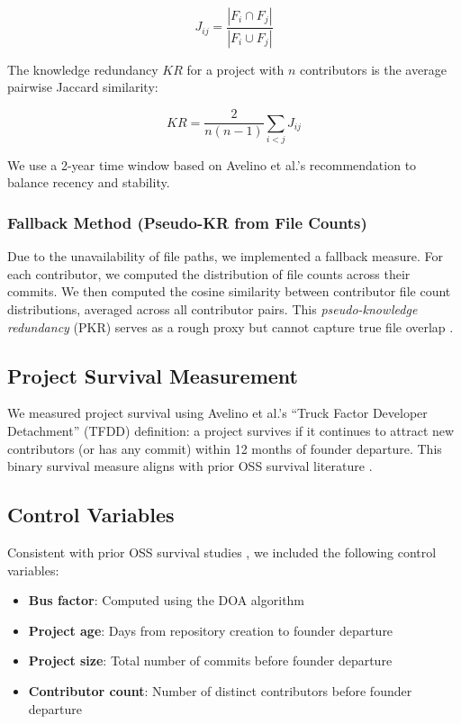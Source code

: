 \documentclass[11pt,letterpaper]{article}
\begin{document}
\begin{equation}
    J_{ij} = \frac{|F_i \cap F_j|}{|F_i \cup F_j|}
\end{equation}

The knowledge redundancy $KR$ for a project with $n$ contributors is the average pairwise Jaccard similarity:

\begin{equation}
    KR = \frac{2}{n(n-1)} \sum_{i<j} J_{ij}
\end{equation}

We use a 2-year time window based on Avelino et al.'s recommendation to balance recency and stability.

\subsubsection{Fallback Method (Pseudo-KR from File Counts)}

Due to the unavailability of file paths, we implemented a fallback measure. For each contributor, we computed the distribution of file counts across their commits. We then computed the cosine similarity between contributor file count distributions, averaged across all contributor pairs. This \textit{pseudo-knowledge redundancy} (PKR) serves as a rough proxy but cannot capture true file overlap \cite{art_pOI-AO_xwHdm}.

\subsection{Project Survival Measurement}

We measured project survival using Avelino et al.'s \cite{Avelino2019} ``Truck Factor Developer Detachment'' (TFDD) definition: a project survives if it continues to attract new contributors (or has any commit) within 12 months of founder departure. This binary survival measure aligns with prior OSS survival literature \cite{Avelino2019, Qiu2019, Ferreira2020}.

\subsection{Control Variables}

Consistent with prior OSS survival studies \cite{Avelino2019, Qiu2019, Ferreira2020}, we included the following control variables:

\begin{itemize}
    \item \textbf{Bus factor}: Computed using the DOA algorithm \cite{Avelino2019}
    \item \textbf{Project age}: Days from repository creation to founder departure
    \item \textbf{Project size}: Total number of commits before founder departure
    \item \textbf{Contributor count}: Number of distinct contributors before founder departure
\end{itemize}
\end{document}
